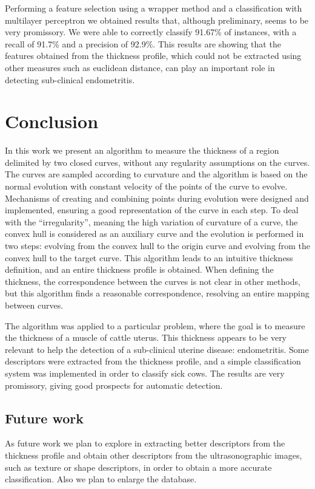 \documentclass{article}
\begin{document}
Performing a feature selection using a wrapper method and a classification with multilayer perceptron we obtained results that, although preliminary, seems to be very promissory. We were able to correctly classify 91.67\% of instances, with a recall of 91.7\% and a precision of 92.9\%. This results are showing that the features obtained from the thickness profile, which could not be extracted using other measures such as euclidean distance, can play an important role in detecting sub-clinical endometritis.

\section{Conclusion}
\label{sec:conc}
In this work we present an algorithm to measure the thickness of a
region delimited by two closed curves, without any regularity
assumptions on the curves. The curves are sampled according to
curvature and the algorithm is based on the normal evolution with
constant velocity of the points of the curve to evolve. Mechanisms of
creating and combining points during evolution were designed and
implemented, ensuring a good representation of the curve in each
step. To deal with the ``irregularity'', meaning the high variation of
curvature of a curve, the convex hull is considered as an auxiliary
curve and the evolution is performed in two steps: evolving from the
convex hull to the origin curve and evolving from the convex hull to
the target curve. This algorithm leads to an intuitive thickness
definition, and an entire thickness profile is obtained. When defining
the thickness, the correspondence between the curves is not clear in
other methods, but this algorithm finds a reasonable correspondence, resolving an entire mapping between curves.

The algorithm was applied to a particular problem, where the goal is to measure the thickness of a muscle of cattle uterus. This thickness appears to be very relevant to help the detection of a sub-clinical uterine disease: endometritis. Some descriptors were extracted from the thickness profile, and a simple classification system was implemented in order to classify sick cows. The results are very promissory, giving good prospects for automatic detection.

\subsection{Future work}
\label{ssec:future}
As future work we plan to explore in extracting better descriptors from the thickness profile and obtain other descriptors from the ultrasonographic images, such as texture or shape descriptors, in order to obtain a more accurate classification. Also we plan to enlarge the database.
\end{document}
